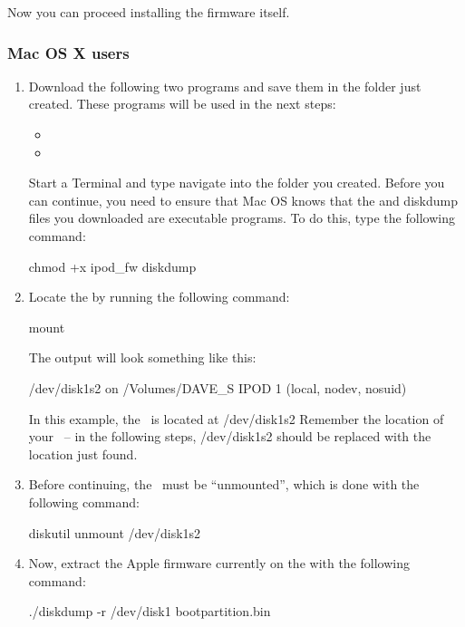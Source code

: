 Now you can proceed installing the firmware itself.

\subsubsection{Mac OS X users}
\begin{enumerate}
  \item Download the following two programs and save them in the folder just
    created. These programs will be used in the next steps:
    \begin{itemize}
      \item {}
      \item {}
    \end{itemize}
    Start a Terminal and type navigate into the folder you created. Before
    you can continue, you need to ensure that Mac OS knows that the
    and diskdump files you downloaded are executable programs. To do this,
    type the following command:
    \begin{code}
    chmod +x ipod_fw diskdump
    \end{code}
  \item Locate the \dap{} by running the following command:
    \begin{code}
    mount
    \end{code}
    The output will look something like this: 
    \begin{code}
    /dev/disk1s2 on /Volumes/DAVE_S IPOD 1 (local, nodev, nosuid)
    \end{code}
    In this example, the \dap\ is located at /dev/disk1s2 Remember the 
    location of your \dap\  -- in the following steps, /dev/disk1s2 should be
    replaced with the location just found.
  \item Before continuing, the \dap\ must be ``unmounted'', which is
    done with the following command:
    \begin{code}
    diskutil unmount /dev/disk1s2
    \end{code}
  \item Now, extract the Apple firmware currently on the \dap{} with the
    following command:
    \begin{code}
    ./diskdump -r /dev/disk1 bootpartition.bin
    \end{code}
\end{enumerate}

